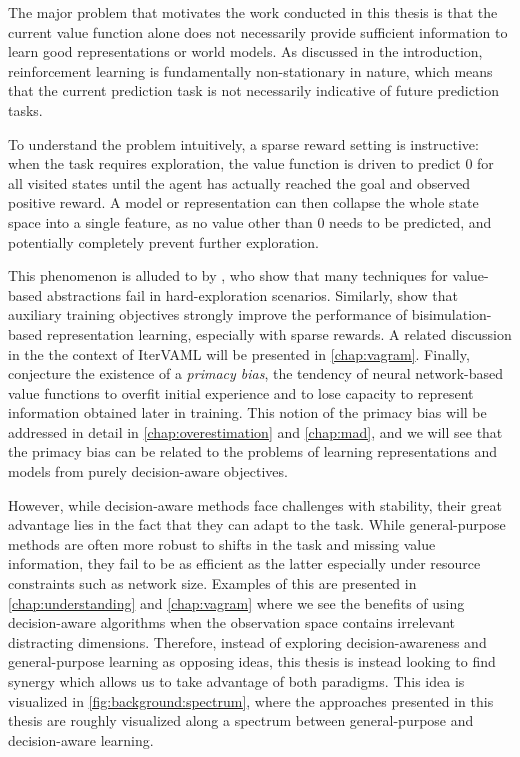 The major problem that motivates the work conducted in this thesis is that the current value function alone does not necessarily provide sufficient information to learn good representations or world models.
As discussed in the introduction, reinforcement learning is fundamentally non-stationary in nature, which means that the current prediction task is not necessarily indicative of future prediction tasks.

To understand the problem intuitively, a sparse reward setting is instructive: when the task requires exploration, the value function is driven to predict $0$ for all visited states until the agent has actually reached the goal and observed positive reward.
A model or representation can then collapse the whole state space into a single feature, as no value other than 0 needs to be predicted, and potentially completely prevent further exploration.

This phenomenon is alluded to by \textcite{tomar2023learning}, who show that many techniques for value-based abstractions fail in hard-exploration scenarios.
Similarly, \textcite{kemertas2021towards} show that auxiliary training objectives strongly improve the performance of bisimulation-based representation learning, especially with sparse rewards.
A related discussion in the the context of IterVAML will be presented in \autoref{chap:vagram}.
Finally, \textcite{nikishin2022primacy} conjecture the existence of a \emph{primacy bias}, the tendency of neural network-based value functions to overfit initial experience and to lose capacity to represent information obtained later in training.
This notion of the primacy bias will be addressed in detail in \autoref{chap:overestimation} and \autoref{chap:mad}, and we will see that the primacy bias can be related to the problems of learning representations and models from purely decision-aware objectives.

However, while decision-aware methods face challenges with stability, their great advantage lies in the fact that they can adapt to the task.
While general-purpose methods are often more robust to shifts in the task and missing value information, they fail to be as efficient as the latter especially under resource constraints such as network size.
Examples of this are presented in \autoref{chap:understanding} and \autoref{chap:vagram} where we see the benefits of using decision-aware algorithms when the observation space contains irrelevant distracting dimensions.
Therefore, instead of exploring decision-awareness and general-purpose learning as opposing ideas, this thesis is instead looking to find synergy which allows us to take advantage of both paradigms.
This idea is visualized in \autoref{fig:background:spectrum}, where the approaches presented in this thesis are roughly visualized along a spectrum between general-purpose and decision-aware learning.

